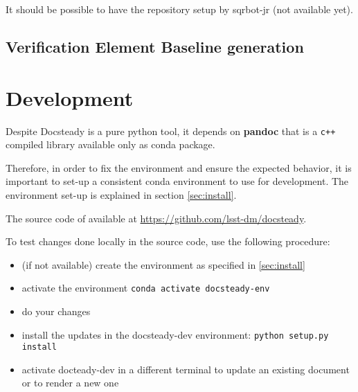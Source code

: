 \documentclass[DM]{lsstdoc}
\begin{document}
It should be possible to have the repository setup by sqrbot-jr (not available yet).


\subsection{Verification Element Baseline generation}


\section{Development}
\label{sec:development}

Despite Docsteady is a pure python tool, it depends on \textbf{pandoc} that is a \texttt{c++} compiled library available only as conda package.

Therefore, in order to fix the environment and ensure the expected behavior, it is important to set-up a consistent conda environment to use for development.
The environment set-up is explained in section \ref{sec:install}.

The source code of available at \url{https://github.com/lsst-dm/docsteady}.

To test changes done locally in the source code, use the following procedure:

\begin{itemize}
\item (if not available) create the environment as specified in \ref{sec:install}
\item activate the environment \texttt{conda activate docsteady-env}
\item do your changes
\item install the updates in the docsteady-dev environment: \texttt{python setup.py install}
\item activate docteady-dev in a different terminal to update an existing document or to render a new one
\end{itemize}
\end{document}
